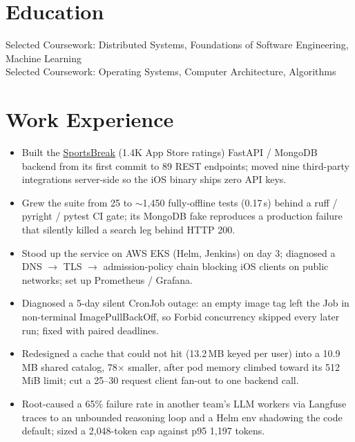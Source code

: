 \documentclass[11pt, letterpaper]{article}
\begin{document}

\section{Education}
Selected Coursework: Distributed Systems, Foundations of Software Engineering, Machine Learning\\[1pt]
Selected Coursework: Operating Systems, Computer Architecture, Algorithms

\section{Work Experience}
\begin{itemize}
  \item Built the \href{https://apps.apple.com/app/id6762649287}{SportsBreak} (1.4K App Store ratings) FastAPI / MongoDB backend from its first commit to 89 REST endpoints; moved nine third-party integrations server-side so the iOS binary ships zero API keys.
  \item Grew the suite from 25 to $\sim$1{,}450 fully-offline tests (0.17\,s) behind a ruff / pyright / pytest CI gate; its MongoDB fake reproduces a production failure that silently killed a search leg behind HTTP 200.
  \item Stood up the service on AWS EKS (Helm, Jenkins) on day 3; diagnosed a DNS $\to$ TLS $\to$ admission-policy chain blocking iOS clients on public networks; set up Prometheus / Grafana.
  \item Diagnosed a 5-day silent CronJob outage: an empty image tag left the Job in non-terminal ImagePullBackOff, so Forbid concurrency skipped every later run; fixed with paired deadlines.
  \item Redesigned a cache that could not hit (13.2\,MB keyed per user) into a 10.9\,MB shared catalog, 78$\times$ smaller, after pod memory climbed toward its 512\,MiB limit; cut a 25--30 request client fan-out to one backend call.
  \item Root-caused a 65\% failure rate in another team's LLM workers via Langfuse traces to an unbounded reasoning loop and a Helm env shadowing the code default; sized a 2{,}048-token cap against p95 1{,}197 tokens.
\end{itemize}
\end{document}
